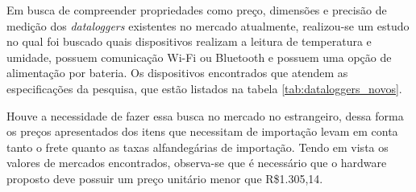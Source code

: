 Em busca de compreender propriedades como preço, dimensões e precisão de medição dos \textit{dataloggers} existentes no mercado atualmente, realizou-se um estudo no qual foi buscado quais dispositivos realizam a leitura de temperatura e umidade, possuem comunicação Wi-Fi ou Bluetooth e possuem uma opção de alimentação por bateria. Os dispositivos encontrados que atendem as especificações da pesquisa, que estão listados na tabela \ref{tab:dataloggers_novos}. 
	\begin{table}[!h]
	
	\captionsetup{width=7cm}%
    \end{table}

Houve a necessidade de fazer essa busca no mercado no estrangeiro, dessa forma os preços apresentados dos itens que necessitam de importação levam em conta tanto o frete quanto as taxas alfandegárias de importação. Tendo em vista os valores de mercados encontrados, observa-se que é necessário que o hardware proposto deve possuir um preço unitário menor que R\$1.305,14. 


